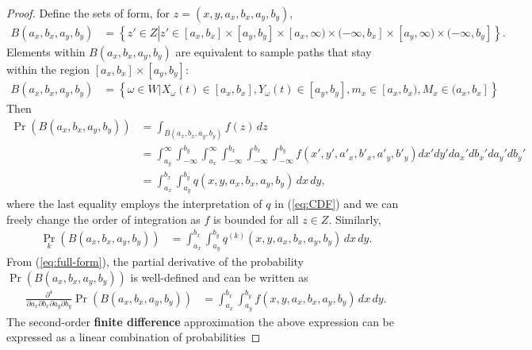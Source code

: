 \begin{proof}
  Define the sets of form, for $z = (x,y,a_x,b_x,a_y,b_y)$,
  \begin{align*}
    B(a_x, b_x, a_y, b_y) &= \left\{ z' \in Z \left| z' \in [a_x, b_x]
        \times [a_y, b_y] \times [a_x, \infty) \times (-\infty, b_x]
                            \times [a_y, \infty) \times (-\infty, b_y] \right.\right\}.
  \end{align*}
  Elements within $B(a_x, b_x, a_y, b_y)$ are equivalent to sample
  paths that stay within the region $[a_x, b_x] \times [a_y, b_y]$:
  \begin{align*}
    B(a_x, b_x, a_y, b_y) &= \left\{ \omega \in W | X_\omega(t) \in [a_x, b_x], Y_\omega(t) \in [a_y, b_y], m_x \in [a_x,b_x), M_x \in (a_x, b_x] \right\}
  \end{align*}
  Then
  \begin{align}
    \Pr(B(a_x, b_x, a_y, b_y)) &= \displaystyle \int_{B(a_x, b_x, a_y, b_y)} f(z)\, dz \nonumber \\ 
                               &= \displaystyle \int_{a_y}^{\infty} \displaystyle \int_{-\infty}^{b_y} \displaystyle \int_{a_x}^{\infty} \displaystyle \int_{-\infty}^{b_x} \displaystyle \int_{-\infty}^{b_x} \displaystyle \int_{-\infty}^{b_y} f(x', y', a'_x, b'_x, a'_y, b'_y) dx' dy' da_x' db_x' da_y' db_y' \label{eq:full-form} \\
                               &= \displaystyle \int_{a_x}^{b_x} \displaystyle \int_{a_y}^{b_y} q(x,y,a_x,b_x,a_y,b_y)\, dx\, dy, \nonumber
  \end{align}
  where the last equality employs the interpretation of $q$ in
  (\ref{eq:CDF}) and we can freely change the order of integration as
  $f$ is bounded for all $z \in Z$. Similarly,
  \begin{align*}
    \Pr_k(B(a_x, b_x, a_y, b_y)) &= \displaystyle \int_{a_x}^{b_x} \displaystyle \int_{a_y}^{b_y} q^{(k)}(x,y,a_x,b_x,a_y,b_y)\, dx\, dy.
  \end{align*}
  From (\ref{eq:full-form}), the partial derivative of the probability
  $\Pr(B(a_x,b_x,a_y,b_y))$ is well-defined and can be written as
  \begin{align*}
    \frac{\partial^4}{\partial a_x \partial b_x \partial a_y \partial b_y} \Pr(B(a_x, b_x, a_y, b_y)) &= \displaystyle \int_{a_x}^{b_x} \displaystyle \int_{a_y}^{b_y} f(x,y,a_x,b_x,a_y,b_y)\, dx\, dy.
  \end{align*}
  The second-order \textbf{finite difference} approximation the above
  expression can be expressed as a linear combination of probabilities

\end{proof}
